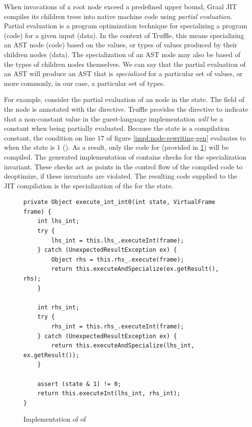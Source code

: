 When invocations of a root node exceed a predefined upper bound, Graal JIT compiles its children trees into native machine code using \textit{partial evaluation}.
Partial evaluation is a program optimization technique for specializing a program (code) for a given input (data)\cite{futamura:partial-eval}.
In the context of Truffle, this means specializing an AST node (code) based on the values, or types of values produced by their children nodes (data)\cite{truffle:partial-eval}.
The specialization of an AST node may also be based of the types of children nodes themselves.
We can say that the partial evaluation of an AST  will produce an AST that is \textit{specialized} for a particular set of values, or more commonly, in our case, a particular set of types.

For example, consider the partial evaluation of an  node in the  state.
The  field of the node is annotated with the  directive.
Truffle provides the  directive to indicate that a non-constant value in the guest-language implementation \textit{will} be a constant when being partially evaluated.
Because the state is a compilation constant, the condition on line $17$ of figure \ref{impl:node-rewriting-gen} evaluates to  when the state is $1$ ().
As a result, only the code for  (provided in \ref{impl:node-rewriting-state2}) will be compiled.
The generated implementation of  contains checks for the specialization invariant.
These checks act as points in the control flow of the compiled code to deoptimize, if these invariants are violated.
The resulting code supplied to the JIT compilation is the specialization of the  for the  state.

\begin{figure}[!htb]
\begin{verbatim}
private Object execute_int_int0(int state, VirtualFrame frame) {
	int lhs_int;
	try {
		lhs_int = this.lhs_.executeInt(frame);
	} catch (UnexpectedResultException ex) {
		Object rhs = this.rhs_.execute(frame);
		return this.executeAndSpecialize(ex.getResult(), rhs);
	}
	
	int rhs_int;
	try {
		rhs_int = this.rhs_.executeInt(frame);
	} catch (UnexpectedResultException ex) {
		return this.executeAndSpecialize(lhs_int, ex.getResult());
	}
	
	assert (state & 1) != 0;
	return this.executeInt(lhs_int, rhs_int);
}
\end{verbatim}
\caption{Implementation of  of }
\label{impl:node-rewriting-state2}
\end{figure}

